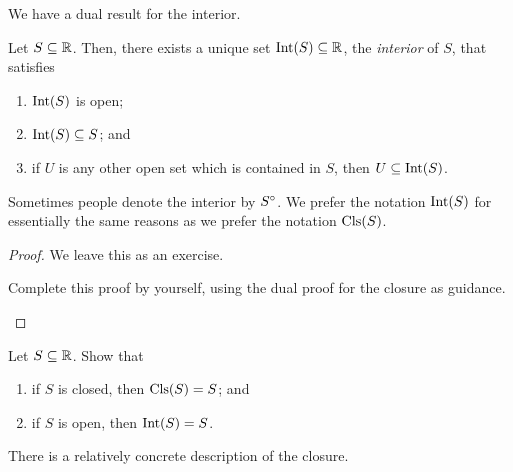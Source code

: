 We have a dual result for the interior.
\begin{prp}[Interior]
Let $S\subseteq \mathbb{R}$.  Then, there exists a unique set $\operatorname{Int} (S)\subseteq \mathbb{R}$, the \emph{interior} of $S$, that satisfies
\begin{enumerate}
\item $\operatorname{Int} (S)$ is open;
\item $\operatorname{Int} (S)\subseteq S$; and
\item if $U$ is any other open set which is contained in $S$, then $U\subseteq \operatorname{Int} (S)$.
\end{enumerate}
\begin{rmk}
Sometimes people denote the interior by $S\degree$.  We prefer the notation $\operatorname{Int} (S)$ for essentially the same reasons as we prefer the notation $\operatorname{Cls} (S)$.
\end{rmk}
\begin{proof}
We leave this as an exercise.
\begin{exr}
Complete this proof by yourself, using the dual proof for the closure as guidance.
\end{exr}
\end{proof}
\end{prp}
\begin{exr}\label{exr3.4.38}
Let $S\subseteq \mathbb{R}$.  Show that
\begin{enumerate}
\item if $S$ is closed, then $\operatorname{Cls} (S)=S$; and
\item if $S$ is open, then $\operatorname{Int} (S)=S$.
\end{enumerate}
\end{exr}
There is a relatively concrete description of the closure.
